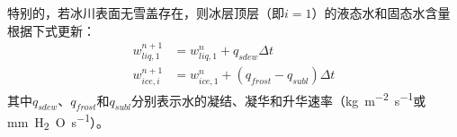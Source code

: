 特别的，若冰川表面无雪盖存在，则冰层顶层（即$i=1$）的液态水和固态水含量根据下式更新：
\begin{equation}
    \begin{aligned}
        w^{n+1}_{liq,1} &= w^{n}_{liq,1} + q_{sdew} \Delta t \\
        w^{n+1}_{ice,i} &= w^{n}_{ice,1} + \left(q_{frost}-q_{subl}\right) \Delta t
    \end{aligned}
\end{equation}
其中$q_{sdew}$、$q_{frost}$和$q_{subl}$分别表示水的凝结、凝华和升华速率（\unit{kg.m^{-2}.s^{-1}}或\unit{mm.H_2O.s^{-1}}）。
